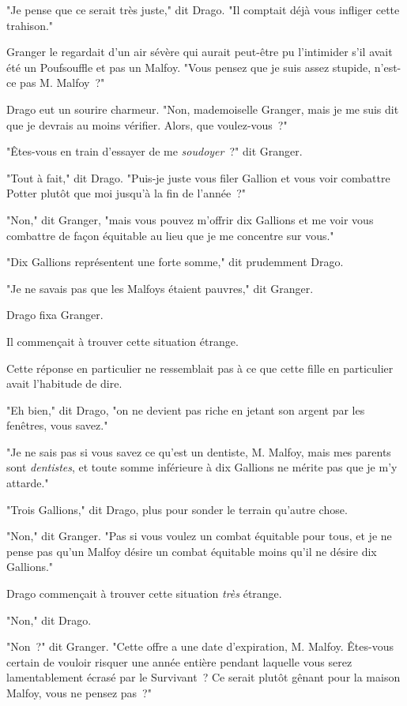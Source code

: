 "Je pense que ce serait très juste," dit Drago. "Il comptait déjà vous infliger cette trahison."

Granger le regardait d'un air sévère qui aurait peut-être pu l'intimider s'il avait été un Poufsouffle et pas un Malfoy. "Vous pensez que je suis assez stupide, n'est-ce pas M. Malfoy~?"

Drago eut un sourire charmeur. "Non, mademoiselle Granger, mais je me suis dit que je devrais au moins vérifier. Alors, que voulez-vous~?"

"Êtes-vous en train d'essayer de me \emph{soudoyer}~?" dit Granger.

"Tout à fait," dit Drago. "Puis-je juste vous filer Gallion et vous voir combattre Potter plutôt que moi jusqu'à la fin de l'année~?"

"Non," dit Granger, "mais vous pouvez m'offrir dix Gallions et me voir vous combattre de façon équitable au lieu que je me concentre sur vous."

"Dix Gallions représentent une forte somme," dit prudemment Drago.

"Je ne savais pas que les Malfoys étaient pauvres," dit Granger.

Drago fixa Granger.

Il commençait à trouver cette situation étrange.

Cette réponse en particulier ne ressemblait pas à ce que cette fille en particulier avait l'habitude de dire.

"Eh bien," dit Drago, "on ne devient pas riche en jetant son argent par les fenêtres, vous savez."

"Je ne sais pas si vous savez ce qu'est un dentiste, M. Malfoy, mais mes parents sont \emph{dentistes}, et toute somme inférieure à dix Gallions ne mérite pas que je m'y attarde."

"Trois Gallions," dit Drago, plus pour sonder le terrain qu'autre chose.

"Non," dit Granger. "Pas si vous voulez un combat équitable pour tous, et je ne pense pas qu'un Malfoy désire un combat équitable moins qu'il ne désire dix Gallions."

Drago commençait à trouver cette situation \emph{très} étrange.

"Non," dit Drago.

"Non~?" dit Granger. "Cette offre a une date d'expiration, M. Malfoy. Êtes-vous certain de vouloir risquer une année entière pendant laquelle vous serez lamentablement écrasé par le Survivant~? Ce serait plutôt gênant pour la maison Malfoy, vous ne pensez pas~?"

